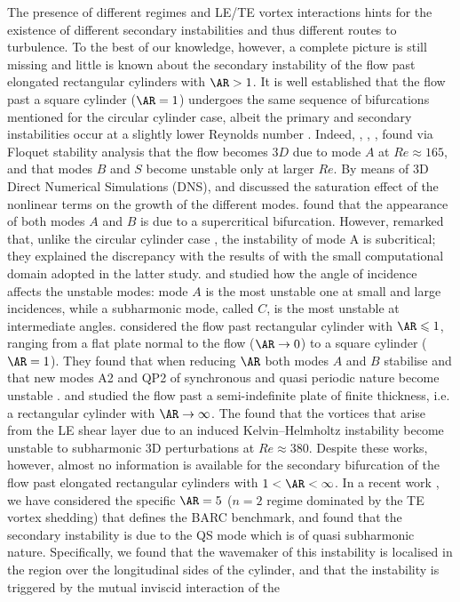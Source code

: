 The presence of different regimes and LE/TE vortex interactions hints for the existence of different secondary instabilities and thus different routes to turbulence. To the best of our knowledge, however, a complete picture is still missing and little is known about the secondary instability of the flow past elongated rectangular cylinders with $\AR>1$. It is well established that the flow past a square cylinder ($\AR=1$) undergoes the same sequence of bifurcations mentioned for the circular cylinder case, albeit the primary and secondary instabilities occur at a slightly lower Reynolds number \citep[see for example][]{jiang-cheng-2018,blackburn-sheard-2010}. Indeed, \cite{robichaux-balachandar-vanka-1999}, \cite{blackburn-lopez-2003}, \cite{sheard-fitzgerald-ryan-2009}, \cite{blackburn-sheard-2010} found via Floquet stability analysis that the flow becomes $3D$ due to mode $A$ at $Re \approx 165$, and that modes $B$ and $S$ become unstable only at larger $Re$. By means of 3D Direct Numerical Simulations (DNS), \cite{sheard-fitzgerald-ryan-2009} and \cite{jiang-cheng-an-2018} discussed the saturation effect of the nonlinear terms on the growth of the different modes. \cite{sheard-fitzgerald-ryan-2009} found that the appearance of both modes $A$ and $B$ is due to a supercritical bifurcation. However, \cite{jiang-cheng-an-2018} remarked that, unlike the circular cylinder case \citep{henderson-1997}, the instability of mode A is subcritical; they explained the discrepancy with the results of \cite{sheard-fitzgerald-ryan-2009} with the small computational domain adopted in the latter study. \cite{sheard-fitzgerald-ryan-2009} and \cite{sheard-2011} studied how the angle of incidence affects the unstable modes: mode $A$ is the most unstable one at small and large incidences, while a subharmonic mode, called $C$, is the most unstable at intermediate angles. \cite{choi-yang-2014} considered the flow past rectangular cylinder with $\AR \le 1$, ranging from a flat plate normal to the flow ($\AR \rightarrow 0$) to a square cylinder ($\AR=1$). They found that when reducing $\AR$ both modes $A$ and $B$ stabilise and that new modes A2 and QP2 of synchronous and quasi periodic nature become unstable \citep[see also][]{thompson-etal-2006}. \cite{chaurasia-thompson-2011} and \cite{huang-etal-2017} studied the flow past a semi-indefinite plate of finite thickness, i.e. a rectangular cylinder with $\AR \rightarrow \infty$. The found that the vortices that arise from the LE shear layer due to an induced Kelvin--Helmholtz instability become unstable to subharmonic 3D perturbations at $Re \approx 380$. Despite these works, however, almost no information is available for the secondary bifurcation of the flow past elongated rectangular cylinders with $1 < \AR < \infty$. In a recent work \citep{chiarini-quadrio-auteri-2022d}, we have considered the specific $\AR=5$ ($n=2$ regime dominated by the TE vortex shedding) that defines the BARC benchmark, and found that the secondary instability is due to the QS mode which is of quasi subharmonic nature. Specifically, we found that the wavemaker \citep{monkewitz-huerre-chomaz-1993} of this instability is localised in the region over the longitudinal sides of the cylinder, and that the instability is triggered by the mutual inviscid interaction of the 